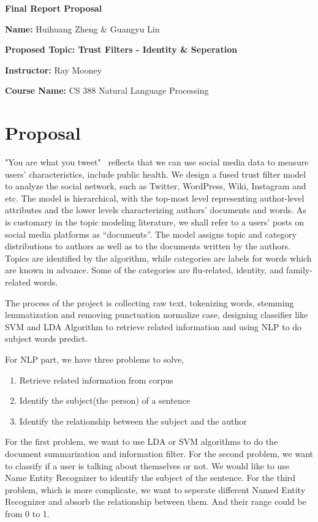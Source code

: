 \documentclass[12pt]{article}
\begin{document}
\thispagestyle{empty}

\bigskip
\bigskip

\centerline{\textbf{\Large{Final Report Proposal}}}

\bigskip
\bigskip


\noindent \textbf{Name:} %
Huihuang Zheng \&
Guangyu Lin

\noindent \textbf{Proposed Topic: Trust Filters - Identity \& Seperation} %

\bigskip

\noindent \textbf{Instructor:} %
Ray Mooney

\bigskip
\noindent \textbf{Course Name:}  
CS 388 Natural Language Processing

\bigskip 

\section*{Proposal}
"You are what you tweet"~\cite{TWEET01} reflects that we can use social media data to measure users' characteristics, include public health. We design a fused trust filter model to analyze the social network, such as Twitter, WordPress, Wiki, Instagram and etc. The model is hierarchical, with the top-most level representing author-level attributes and the lower levels characterizing authors’ documents and words. As is customary in the topic modeling literature, we shall refer to a users’ posts on social media platforms as “documents”. The model assigns topic and category distributions to authors as well as to the documents written by the authors. Topics are identified by the algorithm, while categories are labels for words which are known in advance. Some of the categories are flu-related, identity, and family-related words. 

The process of the project is collecting raw text, tokenizing words, stemming lemmatization and removing punctuation normalize case, designing classifier like SVM and LDA Algorithm to retrieve related information and using NLP to do subject words predict.

For NLP part, we have three problems to solve,
\begin{enumerate}
\item Retrieve related information from corpus
\item Identify the subject(the person) of a sentence
\item Identify the relationship between the subject and the author
\end{enumerate}
For the first problem, we want to use LDA or SVM algorithms to do the document summarization and information filter. For the second problem, we want to classify if a user is talking about themselves or not. We would like to use Name Entity Recognizer to identify the subject of the sentence. For the third problem, which is more complicate, we want to seperate different Named Entity Recognizer and absorb the relationship between them. And their range could be from 0 to 1.
\end{document}
